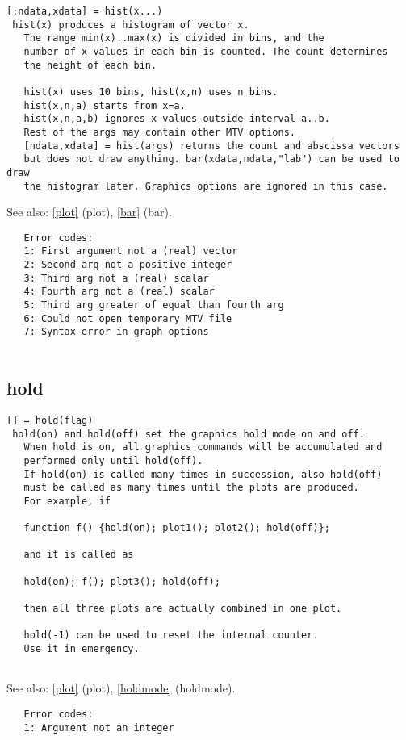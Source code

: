 \documentclass[a4paper]{article}
\begin{document}
\begin{tscreen}
\begin{verbatim}
[;ndata,xdata] = hist(x...)
 hist(x) produces a histogram of vector x.
   The range min(x)..max(x) is divided in bins, and the
   number of x values in each bin is counted. The count determines
   the height of each bin.
   
   hist(x) uses 10 bins, hist(x,n) uses n bins.
   hist(x,n,a) starts from x=a.
   hist(x,n,a,b) ignores x values outside interval a..b.
   Rest of the args may contain other MTV options.
   [ndata,xdata] = hist(args) returns the count and abscissa vectors
   but does not draw anything. bar(xdata,ndata,"lab") can be used to draw
   the histogram later. Graphics options are ignored in this case.
\end{verbatim}

See also: \ref{plot} {(plot)}, \ref{bar} {(bar)}.
\begin{verbatim}
   Error codes:
   1: First argument not a (real) vector
   2: Second arg not a positive integer
   3: Third arg not a (real) scalar
   4: Fourth arg not a (real) scalar
   5: Third arg greater of equal than fourth arg
   6: Could not open temporary MTV file
   7: Syntax error in graph options
   
\end{verbatim}
\end{tscreen}





\subsection{hold\label{hold}}

\begin{tscreen}
\begin{verbatim}
[] = hold(flag)
 hold(on) and hold(off) set the graphics hold mode on and off.
   When hold is on, all graphics commands will be accumulated and
   performed only until hold(off).
   If hold(on) is called many times in succession, also hold(off)
   must be called as many times until the plots are produced.
   For example, if

   function f() {hold(on); plot1(); plot2(); hold(off)};

   and it is called as

   hold(on); f(); plot3(); hold(off);

   then all three plots are actually combined in one plot.

   hold(-1) can be used to reset the internal counter.
   Use it in emergency.
   
\end{verbatim}

See also: \ref{plot} {(plot)}, \ref{holdmode} {(holdmode)}.
\begin{verbatim}
   Error codes:
   1: Argument not an integer 
\end{verbatim}
\end{tscreen}
\end{document}
